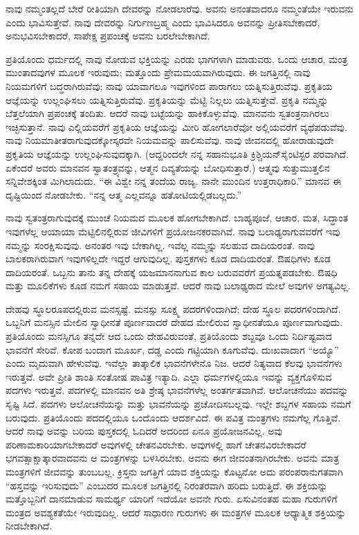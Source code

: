 ನಾವು ನಮ್ಮಂತಲ್ಲದೆ ಬೇರೆ ರೀತಿಯಾಗಿ ದೇವರನ್ನು ನೋಡಲಾರೆವು. ಅವನು ಅನಂತವಾದರೂ ನಮ್ಮಂತೆಯೇ ಇರುವನು ಎಂದು ಭಾವಿಸುತ್ತೇವೆ. ನಾವು ದೇವರನ್ನು ನಿರ್ಗುಣಬ್ರಹ್ಮ ಎಂದು ಭಾವಿಸಿದರೂ ಅವನನ್ನು ಪ್ರೀತಿಸಬೇಕಾದರೆ, ಅನುಭವಿಸಬೇಕಾದರೆ, ಸಾಪೇಕ್ಷ ಪ್ರಪಂಚಕ್ಕೆ ಅವನು ಬರಲೇಬೇಕಾಗಿದೆ.

ಪ್ರತಿಯೊಂದು ಧರ್ಮದಲ್ಲಿ ನಾವು ನೋಡುವ ಭಕ್ತಿಯನ್ನು ಎರಡು ಭಾಗಗಳಾಗಿ ಮಾಡುವರು. ಒಂದು ಆಚಾರ, ಮಂತ್ರ ಮುಂತಾದವುಗಳ ಮೂಲಕ ಇರುವುದು; ಮತ್ತೊಂದು ಪ್ರೇಮಮಯವಾಗಿರುವುದು. ಈ ಜಗತ್ತಿನಲ್ಲಿ ನಾವು ನಿಯಮಗಳಿಗೆ ಬದ್ಧರಾಗಿರುವೆವು; ನಾವು ಯಾವಾಗಲೂ ಇವುಗಳಿಂದ ಪಾರಾಗಲು ಯತ್ನಿಸುತ್ತಿರುವೆವು. ಪ್ರಕೃತಿಯ ಆಜ್ಞೆಯನ್ನು ಉಲ್ಲಂಘಿಸಲು ಯತ್ನಿಸುತ್ತಿರುವೆವು. ಪ್ರಕೃತಿಯನ್ನು ಮೆಟ್ಟಿ ನಿಲ್ಲಲು ಯತ್ನಿಸುತ್ತೇವೆ. ಪ್ರಕೃತಿ ನಮ್ಮನ್ನು ಬೆತ್ತಲೆಯಾಗಿ ಪ್ರಪಂಚಕ್ಕೆ ತಂದಿತು. ಆದರೆ ನಾವು ಬಟ್ಟೆಯನ್ನು ಹಾಕಿಕೊಳ್ಳುವೆವು. ಮಾನವನು ಸ್ವತಂತ್ರನಾಗಿರಲು ಇಚ್ಛಿಸುತ್ತಾನೆ. ನಾವು ಎಲ್ಲಿಯವರೆಗೆ ಪ್ರಕೃತಿಯ ಆಜ್ಞೆಯನ್ನು ಮೀರಿ ಹೋಗಲಾರೆವೋ ಅಲ್ಲಿಯವರೆಗೆ ವ್ಯಥೆಪಡುವೆವು. ನಾವು ನಿಯಮಾತೀತರಾಗುವುದಕ್ಕೋಸ್ಕರವೇ ನಿಯಮವನ್ನು ಪಾಲಿಸುವೆವು. ನಾವು ಜೀವನದಲ್ಲಿ ಹೋರಾಡುವುದೇ ಪ್ರಕೃತಿಯ ಆಜ್ಞೆಯನ್ನು ಉಲ್ಲಂಘಿಸುವುದಕ್ಕಾಗಿ. (ಆದ್ದರಿಂದಲೇ ನನ್ನ ಸಹಾನುಭೂತಿ ಕ್ರಿಶ್ಚಿಯನ್​ ಸೈಂಟಿಸ್ಟರ ಪರವಾಗಿದೆ. ಏಕೆಂದರೆ ಅವರು ಮಾನವನ ಸ್ವಾತಂತ್ರ್ಯವನ್ನು, ಆತ್ಮನ ದಿವ್ಯತೆಯನ್ನು ಬೋಧಿಸುತ್ತಾರೆ.) ಆತ್ಮವು ಸುತ್ತುಮುತ್ತಲಿನ ಸನ್ನಿವೇಶಕ್ಕಿಂತ ಮಿಗಿಲಾದುದು. “ಈ ವಿಶ್ವೇ ನನ್ನ ತಂದೆಯ ರಾಜ್ಯ. ನಾನೇ ಮುಂದಿನ ಉತ್ತರಾಧಿಕಾರಿ.” ಮಾನವ ಈ ದೃಷ್ಟಿಯಿಂದ ನೋಡಬೇಕು. “ನನ್ನ ಆತ್ಮ ಎಲ್ಲವನ್ನೂ ಹತೋಟಿಯಲ್ಲಿಡಬಲ್ಲದು.”

ನಾವು ಸ್ವತಂತ್ರರಾಗುವುದಕ್ಕೆ ಮುಂಚೆ ನಿಯಮದ ಮೂಲಕ ಹೋಗಬೇಕಾಗಿದೆ. ಬಾಹ್ಯಪೂಜೆ, ಆಚಾರ, ಮತ, ಸಿದ್ಧಾಂತ ಇವುಗಳೆಲ್ಲ ಆಯಾಯಾ ಮೆಟ್ಟಿಲಿನಲ್ಲಿರುವ ಜೀವಿಗಳಿಗೆ ಪ್ರಯೋಜನಕರವಾಗಿವೆ. ನಾವು ಬಲಾಢ್ಯರಾಗುವವರೆಗೆ ಇವು ನಮ್ಮನ್ನು ಸಂರಕ್ಷಿಸುವುವು. ಅನಂತರ ಇವು ಬೇಕಾಗಿಲ್ಲ. ಇವೆಲ್ಲ ನಮ್ಮನ್ನು ಸಲಹುವ ದಾದಿಯರಂತೆ. ನಾವು ಬಾಲಕರಾಗಿರುವಾಗ ಇವುಗಳಿಲ್ಲದೇ ಇದ್ದರೆ ಆಗುವುದಿಲ್ಲ. ಪುಸ್ತಕಗಳು ಕೂಡ ದಾದಿಯರಂತೆ. ಔಷಧಿಗಳು ಕೂಡ ದಾದಿಯರಂತೆ. ಒಬ್ಬನು ತಾನು ತನ್ನ ದೇಹಕ್ಕೆ ಯಜಮಾನನಾಗುವ ಕಾಲ ಬರುವವರೆಗೆ ಪ್ರಯತ್ನಪಡಬೇಕು. ಔಷಧಿ ಮತ್ತು ಮೂಲಿಕೆಗಳು ಕೂಡ ನಮಗೆ ಸಹಾಯ ಮಾಡುತ್ತವೆ. ಆದರೆ ನಾವು ಬಲಾಢ್ಯರಾದ ಮೇಲೆ ಅವುಗಳ ಅಗತ್ಯವಿಲ್ಲ.

ದೇಹವು ಸ್ಥೂಲರೂಪದಲ್ಲಿರುವ ಮನಸ್ಸಷ್ಟೆ. ಮನಸ್ಸು ಸೂಕ್ಷ್ಮ ಪದರಗಳಿಂದಾಗಿದೆ; ದೇಹ ಸ್ಥೂಲ ಪದರಗಳಿಂದಾಗಿದೆ. ಒಬ್ಬನಿಗೆ ಮನಸ್ಸಿನ ಮೇಲಿನ ಸ್ವಾಧೀನತೆ ಪೂರ್ಣವಾದರೆ ದೇಹದ ಮೇಲಿರುವ ಸ್ವಾಧೀನತೆಯೂ ಪೂರ್ಣವಾಗುವುದು. ಪ್ರತಿಯೊಂದು ಮನಸ್ಸಿಗೂ ತನ್ನದೇ ಆದ ಒಂದು ದೇಹವಿರುವಂತೆ, ಪ್ರತಿಯೊಂದು ಶಬ್ದವೂ ಒಂದು ನಿರ್ದಿಷ್ಟವಾದ ಭಾವನೆಗೆ ಸೇರಿವೆ. ಕೋಪ ಬಂದಾಗ ಮೂರ್ಖ, ದಡ್ಡ ಎಂದು ಗಟ್ಟಿಯಾಗಿ ಕೂಗುವೆವು. ದುಃಖವಾದಾಗ “ಅಯ್ಯೊ” ಎಂದು ಮೃದುವಾಗಿ ಹೇಳುವೆವು. ಇವೆಲ್ಲಾ ತಾತ್ಕಾಲಿಕ ಭಾವನೆಗಳೇನೊ ನಿಜ. ಆದರೆ ನಿತ್ಯವಾದ ಕೆಲವು ಭಾವನೆಗಳು ಇರುತ್ತವೆ. ಅವೇ ಪ್ರೀತಿ ಶಾಂತಿ ಸಂತೋಷ ಪಾವಿತ್ರ ಇತ್ಯಾದಿ. ಎಲ್ಲಾ ಧರ್ಮಗಳಲ್ಲಿಯೂ ಇವನ್ನು ವ್ಯಕ್ತಗೊಳಿಸುವ ಪದಗಳು ಇರುತ್ತವೆ. ಪದಗಳಲ್ಲಿ ಮಾನವನ ಅತಿ ಶ್ರೇಷ್ಠ ಭಾವನೆಗಳೆಲ್ಲ ಅಂತರ್ಗತವಾಗಿವೆ. ಆಲೋಚನೆಯು ಪದವನ್ನು ಸೃಷ್ಟಿ ಸಿದೆ. ಪದಗಳು ಆಲೋಚನೆಯನ್ನು ಮತ್ತು ಭಾವನೆಯನ್ನು ಪ್ರಚೋದಿಸಬಲ್ಲವು. ಇಲ್ಲೇ ಶಬ್ದಗಳ ಸಹಾಯ ನಮಗೆ ಬರುವುದು. ಪ್ರತಿಯೊಂದು ಪದದಲ್ಲಿಯೂ ಒಂದೊಂದು ಆದರ್ಶವಿದೆ. ಈ ಪವಿತ್ರ ಮಂತ್ರಗಳು ನಮಗೆಲ್ಲ ಗೊತ್ತಿವೆ. ಆದರೆ ನಾವು ಅವನ್ನು ಬರಿಯ ಪುಸ್ತಕದಲ್ಲಿ ಓದಿದರೆ ಅದರಿಂದ ಏನೂ ಪ್ರಯೋಜನವಿಲ್ಲ. ಅವು ಪರಿಣಾಮಕಾರಿಯಾಗಬೇಕಾದರೆ ಅವುಗಳಲ್ಲಿ ಚೇತನವಿರಬೇಕು. ಅವುಗಳಲ್ಲಿ ಹಾಗೆ ಚೇತನವಿರಬೇಕಾದರೆ ಭಗವತ್ಸಾಕ್ಷಾತ್ಕಾರವಾದವನು ಆ ಮಂತ್ರಗಳನ್ನು ಬಳಸಿರಬೇಕು. ಅವನು ಈಗ ಜೀವಂತನಾಗಿರಬೇಕು. ಅವನು ಮಾತ್ರ ಮಂತ್ರಗಳಿಗೆ ಜೀವವನ್ನು ತುಂಬಬಲ್ಲ. ಕ್ರಿಸ್ತನು ಜಗತ್ತಿಗೆ ಯಾವ ಶಕ್ತಿಯನ್ನು ಕೊಟ್ಟನೋ ಅದು ಪರಂಪರಾನುಗತವಾಗಿ “ಹಸ್ತವನ್ನು ಇರಿಸುವುದು” ಎಂಬುದರ ಮೂಲಕ ಜಗತ್ತಿನಲ್ಲಿ ನಿರಂತರವಾಗಿ ಹರಿದು ಬರುತ್ತಿದೆ. ಈ ಶಕ್ತಿಯನ್ನು ಮತ್ತೊಬ್ಬನಿಗೆ ದಾನಮಾಡುವ ಸಾಮರ್ಥ್ಯ ಯಾರಿಗೆ ಇದೆಯೋ ಅವನೇ ಗುರು. ಏಸುವಿನಂತಹ ಮಹಾ ಗುರುಗಳಿಗೆ ಮಂತ್ರದ ಅವಶ್ಯಕತೆಯೇ ಇರುವುದಿಲ್ಲ. ಆದರೆ ಸಾಧಾರಣ ಗುರುಗಳು ಈ ಮಂತ್ರಗಳ ಮೂಲಕ ಆಧ್ಯಾತ್ಮಿಕ ಶಕ್ತಿಯನ್ನು ನೀಡಬೇಕಾಗಿದೆ.

